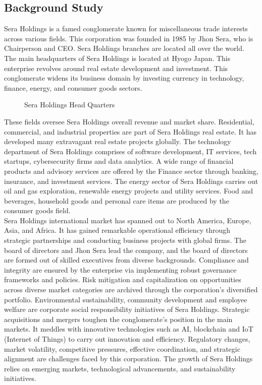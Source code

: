 \documentclass[12pt,a4Paper]{article}
\begin{document}
\subsection{Background Study}
Sera Holdings is a famed conglomerate known for miscellaneous trade interests across various fields. This corporation was founded in 1985 by Jhon Sera, who is Chairperson and CEO. Sera Holdings branches are located all over the world. The main headquarters of Sera Holdings is located at Hyogo Japan. This enterprise revolves around real estate development and investment. This conglomerate widens its business domain by investing currency in technology, finance, energy, and consumer goods sectors.\\[12pt]
\begin{figure}[H]
\centering
\caption{Sera Holdings Head Quarters}
\end{figure}
These fields oversee Sera Holdings overall revenue and market share. Residential, commercial, and industrial properties are part of Sera Holdings real estate. It has developed many extravagant real estate projects globally. The technology department of Sera Holdings comprises of software development, IT services, tech startups, cybersecurity firms and data analytics. A wide range of financial products and advisory services are offered by the Finance sector through banking, insurance, and investment services. The energy sector of Sera Holdings carries out oil and gas exploration, renewable energy projects and utility services. Food and beverages, household goods and personal care items are produced by the consumer goods field.\\[12pt]
Sera Holdings international market has spanned out to North America, Europe, Asia, and Africa. It has gained remarkable operational efficiency through strategic partnerships and conducting business projects with global firms. The board of directors and Jhon Sera lead the company, and the board of directors are formed out of skilled executives from diverse backgrounds. Compliance and integrity are ensured by the enterprise via implementing robust governance frameworks and policies. Risk mitigation and capitalization on opportunities across diverse market categories are archived through the corporation’s diversified portfolio. Environmental sustainability, community development and employee welfare are corporate social responsibility initiatives of Sera Holdings. Strategic acquisitions and mergers toughen the conglomerate’s position in the main markets. It meddles with innovative technologies such as AI, blockchain and IoT (Internet of Things) to carry out innovation and efficiency. Regulatory changes, market volatility, competitive pressures, effective coordination, and strategic alignment are challenges faced by this corporation. The growth of Sera Holdings relies on emerging markets, technological advancements, and sustainability initiatives.
\end{document}
